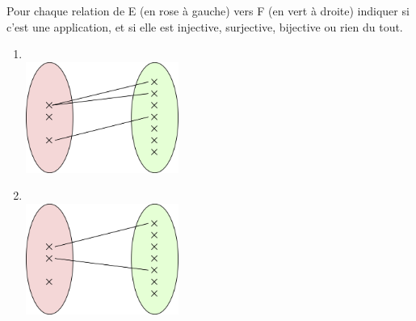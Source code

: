 \documentclass[a4paper,12pt,french]{book}
\begin{document}
\begin{exercice}[]

Pour chaque relation de E (en rose à gauche) vers F (en vert à droite) indiquer si c'est une application, et si elle est injective, surjective, bijective ou rien du tout.

\begin{multicols}{2}

\def\myw{5cm}
\begin{enumerate}
	\item 	\ \\\includegraphics[width=\myw]{img/1.png}
	\item 	\ \\\includegraphics[width=\myw]{img/2.png}

\end{enumerate}
\end{multicols}
\end{exercice}
\end{document}
